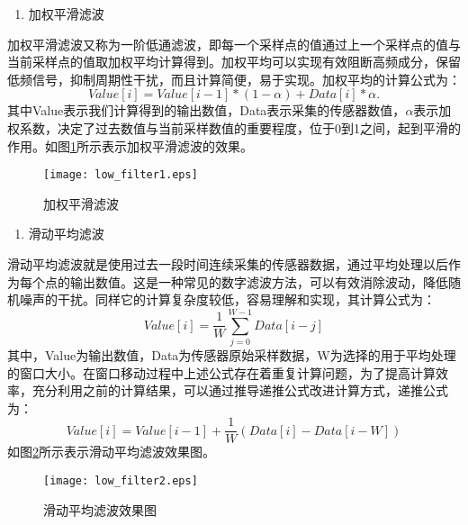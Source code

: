 \begin{enumerate}[(1)]
	\item 加权平滑滤波
\end{enumerate}
\par 加权平滑滤波又称为一阶低通滤波，即每一个采样点的值通过上一个采样点的值与当前采样点的值取加权平均计算得到。加权平均可以实现有效阻断高频成分，保留低频信号，抑制周期性干扰，而且计算简便，易于实现。加权平均的计算公式为：
\begin{equation}
	Value[i] = Value[i-1]*(1-\alpha) + Data[i]*\alpha.
\end{equation}
其中Value表示我们计算得到的输出数值，Data表示采集的传感器数值，$\alpha$表示加权系数，决定了过去数值与当前采样数值的重要程度，位于0到1之间，起到平滑的作用。如图\ref{low_filter1}所示表示加权平滑滤波的效果。
\begin{figure}[htb]
\centering
\texttt{[image: low\_filter1.eps]}
\caption{加权平滑滤波} \label{low_filter1}
\end{figure}


\begin{enumerate}[(2)]
	\item 滑动平均滤波
\end{enumerate}

\par 滑动平均滤波就是使用过去一段时间连续采集的传感器数据，通过平均处理以后作为每个点的输出数值。这是一种常见的数字滤波方法，可以有效消除波动，降低随机噪声的干扰。同样它的计算复杂度较低，容易理解和实现，其计算公式为：
\begin{equation}
	Value[i] = \frac{1}{W}\sum_{j=0}^{W-1}Data[i-j]
\end{equation}
其中，Value为输出数值，Data为传感器原始采样数据，W为选择的用于平均处理的窗口大小。在窗口移动过程中上述公式存在着重复计算问题，为了提高计算效率，充分利用之前的计算结果，可以通过推导递推公式改进计算方式，递推公式为：
\begin{equation}
	Value[i] = Value[i-1] + \frac{1}{W}(Data[i] - Data[i-W])
\end{equation}
如图\ref{low_filter2}所示表示滑动平均滤波效果图。
\begin{figure}[htb]
\centering
\texttt{[image: low\_filter2.eps]}
\caption{滑动平均滤波效果图}\label{low_filter2}
\end{figure}

